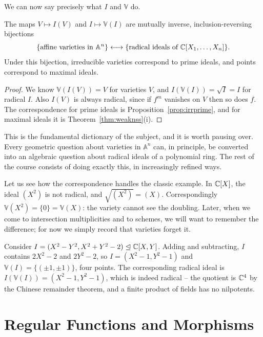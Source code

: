 \documentclass[a4paper]{scrartcl}
\newcommand{\A}{\mathbb{A}}
\newcommand{\V}{\mathbb{V}}
\begin{document}
We can now say precisely what $I$ and $\V$ do.

\begin{corollary}\label{cor:dictionary}
	The maps $V \mapsto I(V)$ and $I \mapsto \V(I)$ are mutually inverse, inclusion-reversing bijections
	$$\{\text{affine varieties in } \A^n\} \longleftrightarrow \{\text{radical ideals of } \C[X_1,\dots,X_n]\}.$$
	Under this bijection, irreducible varieties correspond to prime ideals, and points correspond to maximal ideals.
\end{corollary}

\begin{proof}
	We know $\V(I(V)) = V$ for varieties $V$, and $I(\V(I)) = \sqrt I = I$ for radical $I$. Also $I(V)$ is always radical, since if $f^m$ vanishes on $V$ then so does $f$. The correspondence for prime ideals is Proposition~\ref{prop:irrprime}, and for maximal ideals it is Theorem~\ref{thm:weaknss}(i).
\end{proof}

This is the fundamental dictionary of the subject, and it is worth pausing over. Every geometric question about varieties in $\A^n$ can, in principle, be converted into an algebraic question about radical ideals of a polynomial ring. The rest of the course consists of doing exactly this, in increasingly refined ways.

\begin{example}
	Let us see how the correspondence handles the classic example. In $\mathbb{C}[X]$, the ideal $(X^2)$ is not radical, and $\sqrt{(X^2)} = (X)$. Correspondingly $\V(X^2) = \{0\} = \V(X)$: the variety cannot see the doubling. Later, when we come to intersection multiplicities and to schemes, we will want to remember the difference; for now we simply record that varieties forget it.
\end{example}

\begin{example}
	Consider $I = (X^2 - Y^2, X^2+Y^2 - 2) \trianglelefteq \mathbb{C}[X,Y]$. Adding and subtracting, $I$ contains $2X^2 - 2$ and $2Y^2-2$, so $I = (X^2-1, Y^2-1)$ and $\V(I) = \{(\pm 1, \pm 1)\}$, four points. The corresponding radical ideal is $I(\V(I)) = (X^2-1,Y^2-1)$, which is indeed radical -- the quotient is $\mathbb{C}^4$ by the Chinese remainder theorem, and a finite product of fields has no nilpotents.
\end{example}

\section{Regular Functions and Morphisms}
\end{document}
